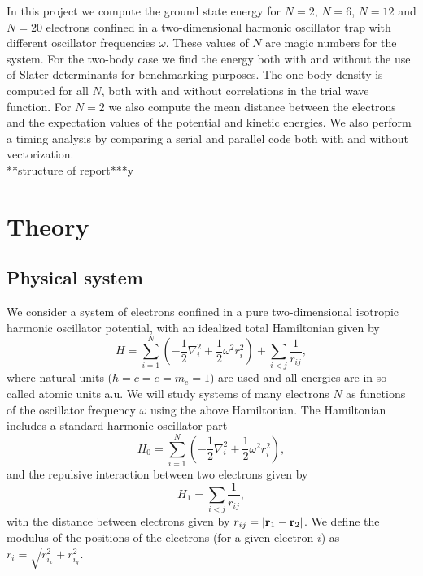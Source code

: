 \documentclass[english, a4paper]{article}
\begin{document}
\noindent In this project we compute the ground state energy for
$N=2$, $N=6$, $N=12$ and $N=20$ electrons
confined in a two-dimensional harmonic oscillator trap with different oscillator frequencies $\omega$.
These values of $N$ are magic numbers for the system.
For the two-body case we find the energy both with and without the use of Slater determinants for 
benchmarking purposes. The one-body density is computed for all $N$, both with and without correlations
in the trial wave function. 
For $N=2$ we also compute the mean distance between the electrons and the expectation values of the potential
and kinetic energies. We also perform a timing analysis by comparing a serial and parallel code both with 
and without vectorization.\\

\noindent ***structure of report***y



\section{Theory}
\subsection{Physical system}
We consider a system of electrons confined in a pure two-dimensional 
isotropic harmonic oscillator potential, with an idealized  total Hamiltonian given by 
\begin{equation}
\label{fullHamiltonian}
H=\sum_{i=1}^{N} \left(  -\frac{1}{2} \nabla_i^2 + \frac{1}{2} \omega^2r_i^2  \right)+\sum_{i<j}\frac{1}{r_{ij}},
\end{equation}
where natural units ($\hbar=c=e=m_e=1$) are used and all energies are in so-called atomic units a.u. We will study systems of many electrons $N$ as functions of the oscillator frequency  $\omega$ using the above Hamiltonian.  The Hamiltonian includes a standard harmonic oscillator part
\begin{equation}
H_0=\sum_{i=1}^{N} \left(  -\frac{1}{2} \nabla_i^2 + \frac{1}{2} \omega^2r_i^2  \right),
\label{OneBodyHamiltonian}
\end{equation}
and the repulsive interaction between two electrons given by 
\begin{equation}
H_1=\sum_{i<j}\frac{1}{r_{ij}},
\end{equation}
with the distance between electrons given by $r_{ij}=\vert {\bf r}_1-{\bf r}_2\vert$. We define the 
modulus of the positions of the electrons (for a given electron $i$) as $r_i = \sqrt{r_{i_x}^2+r_{i_y}^2}$.\\
\end{document}
